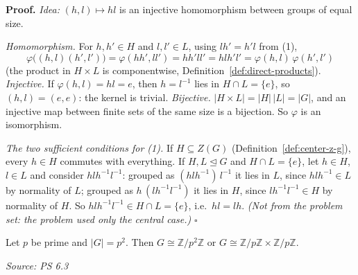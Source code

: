 \documentclass[11pt]{report}
\renewenvironment{proof}[1][Proof]{\noindent\textbf{#1.} }{\hfill$\square$\par\vspace{5pt}}
\newcommand{\srcline}[1]{\par\hfill{\footnotesize\textit{Source: #1}}}
\begin{document}
\begin{proof}
\textit{Idea:} $(h, l) \mapsto hl$ is an injective homomorphism between groups of equal size.\par
\emph{Homomorphism.} For $h, h' \in H$ and $l, l' \in L$, using $lh' = h'l$ from (1),
\[ \varphi\big((h, l)(h', l')\big) = \varphi(hh', ll') = hh'll' = hlh'l' = \varphi(h, l)\,\varphi(h', l') \]
(the product in $H \times L$ is componentwise, Definition~\ref{def:direct-products}). \emph{Injective.} If $\varphi(h, l) = hl = e$, then $h = l^{-1}$ lies in $H \cap L = \{e\}$, so $(h, l) = (e, e)$: the kernel is trivial. \emph{Bijective.} $|H \times L| = |H|\,|L| = |G|$, and an injective map between finite sets of the same size is a bijection. So $\varphi$ is an isomorphism.

\emph{The two sufficient conditions for (1).} If $H \subseteq Z(G)$ (Definition~\ref{def:center-z-g}), every $h \in H$ commutes with everything. If $H, L \trianglelefteq G$ and $H \cap L = \{e\}$, let $h \in H$, $l \in L$ and consider $hlh^{-1}l^{-1}$: grouped as $(hlh^{-1})\,l^{-1}$ it lies in $L$, since $hlh^{-1} \in L$ by normality of $L$; grouped as $h\,(lh^{-1}l^{-1})$ it lies in $H$, since $lh^{-1}l^{-1} \in H$ by normality of $H$. So $hlh^{-1}l^{-1} \in H \cap L = \{e\}$, i.e.\ $hl = lh$. \textit{(Not from the problem set: the problem used only the central case.)}
\end{proof}

\begin{thmbox}\label{thm:groups-order-p-squared}
Let $p$ be prime and $|G| = p^2$. Then $G \cong \mathbb{Z}/p^2\mathbb{Z}$ or $G \cong \mathbb{Z}/p\mathbb{Z} \times \mathbb{Z}/p\mathbb{Z}$.
\srcline{PS 6.3}
\end{thmbox}
\end{document}
